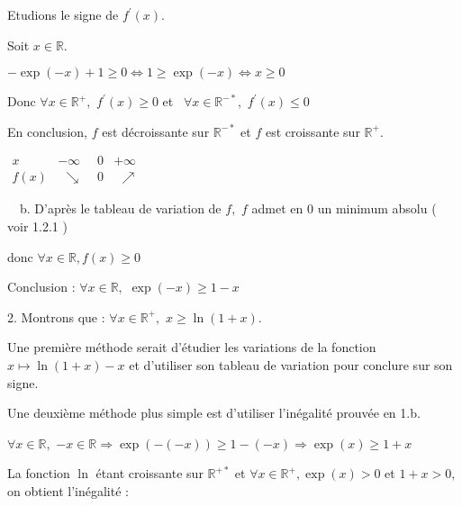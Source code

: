 \documentclass{article}
\begin{document}
Etudions le signe de $f^{\prime }(x).$

Soit $x\in 
\mathbb{R}
.$

$-\exp (-x)+1\geq 0\Leftrightarrow 1\geq \exp (-x)\Leftrightarrow x\geq 0$

Donc $\forall x\in 
\mathbb{R}
^{+},$ $f^{\prime }(x)\geq 0$ et \ $\forall x\in 
\mathbb{R}
^{-\ast },$ $f^{\prime }(x)\leq 0$

En conclusion, $f$ est d\'{e}croissante sur $%
\mathbb{R}
^{-\ast }$ et $f$ est croissante sur $%
\mathbb{R}
^{+}.$

$%
\begin{array}{cccc}
x & -\infty & 0 & +\infty \\ 
f(x) & \text{ \ \ }\searrow \text{\ \ \ \ \ \ } & 0 & \text{ \ \ \ \ }%
\nearrow \text{\ \ \ \ \ \ \ }%
\end{array}%
$

\ \ b. D'apr\`{e}s le tableau de variation de $f,$ $f$ admet en $0$ un
minimum absolu ( voir 1.2.1 )

donc $\forall x\in 
\mathbb{R}
,f(x)\geq 0$

Conclusion : $\forall x\in 
\mathbb{R}
,$ $\exp (-x)\geq 1-x$

2. Montrons que : $\forall x\in 
\mathbb{R}
^{+},$ $x\geq \ln (1+x).$

Une premi\`{e}re m\'{e}thode serait d'\'{e}tudier les variations de la
fonction $x\mapsto \ln (1+x)-x$ et d'utiliser son tableau de variation pour
conclure sur son signe.

Une deuxi\`{e}me m\'{e}thode plus simple est d'utiliser l'in\'{e}galit\'{e}
prouv\'{e}e en 1.b.

$\forall x\in 
\mathbb{R}
,$ $-x\in 
\mathbb{R}
\Rightarrow \exp (-(-x))\geq 1-(-x)\Rightarrow \exp (x)\geq 1+x$

La fonction $\ln $ \'{e}tant croissante sur $%
\mathbb{R}
^{+\ast }$ et $\forall x\in 
\mathbb{R}
^{+},\exp (x)>0$ et $1+x>0,$ on obtient l'in\'{e}galit\'{e} :
\end{document}
